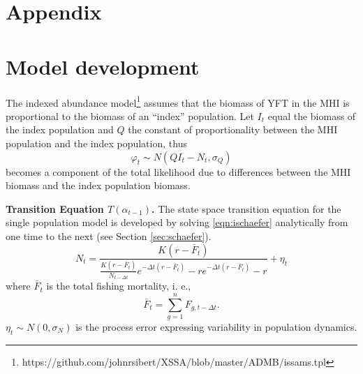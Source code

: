 \documentclass[12pt,letterpaper,twoside]{article}
\begin{document}
\clearpage


\section*{Appendix}
\appendix
\section{Model development}
\label{sec:models}
The indexed abundance model\footnote{https://github.com/johnrsibert/XSSA/blob/master/ADMB/issams.tpl}
assumes that the biomass of YFT in the MHI
is proportional to the biomass of an ``index'' population.
Let $I_t$ equal the biomass of the index population and $Q$ the
constant of proportionality between the MHI population and the index
population, thus
\begin{equation}
\label{eqn:Qprop}
\varphi_t \sim N(QI_t-N_t,\sigma_Q)
\end{equation}
becomes a component of the total likelihood due to differences between
the MHI biomass and the index population biomass.


{\bf Transition Equation $T(\alpha_{t-1})$.}
The state space transition equation for the single population model is
developed by solving \ref{eqn:ischaefer} analytically from one time to
the next (see Section \ref{sec:schaefer}).
\begin{equation}
N_t = \frac{K(r-\bar{F}_t)}{\frac{K(r-\bar{F}_t)}{N_{t-\Delta t}}e^{-\Delta
t(r-\bar{F}_t)}-re^{-\Delta t(r-\bar{F}_t)} -r} + \eta_t
\end{equation}
where 
$\bar{F}_t$ is the total fishing mortality, i. e.,
$$
\bar{F}_t =\sum_{g=1}^n F_{g,t-\Delta t}.
$$
$\eta_t \sim N(0,\sigma_N)$ is the process error expressing
variability in population dynamics.
\end{document}
